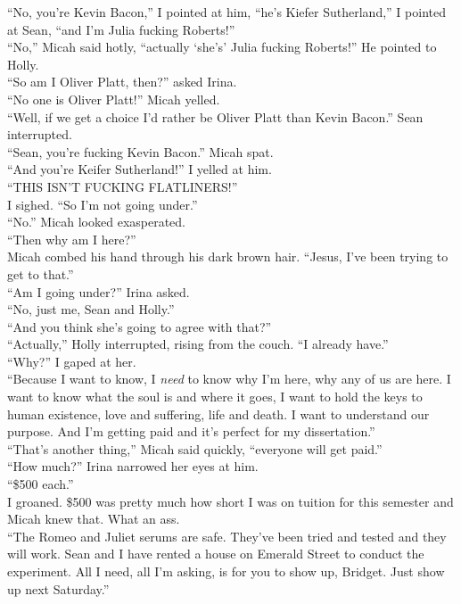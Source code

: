 \documentclass[a5paper]{scrartcl}
\begin{document}
\enquote{No, you're Kevin Bacon,” I pointed at him, “he's Kiefer Sutherland,} I pointed at Sean, \enquote{and I'm Julia fucking Roberts!}\\
\enquote{No,} Micah said hotly, \enquote{actually \enquote{she's} Julia fucking Roberts!} He pointed to Holly.\\
\enquote{So am I Oliver Platt, then?} asked Irina.\\
\enquote{No one is Oliver Platt!} Micah yelled.\\
\enquote{Well, if we get a choice I'd rather be Oliver Platt than Kevin Bacon.} Sean interrupted.\\
\enquote{Sean, you're fucking Kevin Bacon.} Micah spat.\\
\enquote{And you're Keifer Sutherland!} I yelled at him.\\
\enquote{THIS ISN'T FUCKING FLATLINERS!}\\
I sighed. \enquote{So I'm not going under.}\\
\enquote{No.} Micah looked exasperated.\\
\enquote{Then why am I here?}\\
Micah combed his hand through his dark brown hair. \enquote{Jesus, I've been trying to get to that.}\\
\enquote{Am I going under?} Irina asked.\\
\enquote{No, just me, Sean and Holly.}\\
\enquote{And you think she's going to agree with that?}\\
\enquote{Actually,} Holly interrupted, rising from the couch. \enquote{I already have.}\\
\enquote{Why?} I gaped at her.\\
\enquote{Because I want to know, I \textit{need} to know why I'm here, why any of us are here. I want to know what the soul is and where it goes, I want to hold the keys to human existence, love and suffering, life and death. I want to understand our purpose. And I'm getting paid and it's perfect for my dissertation.}\\
\enquote{That's another thing,} Micah said quickly, \enquote{everyone will get paid.}\\
\enquote{How much?} Irina narrowed her eyes at him.\\
\enquote{\$500 each.}\\
I groaned. \$500 was pretty much how short I was on tuition for this semester and Micah knew that. What an ass.\\
\enquote{The Romeo and Juliet serums are safe. They've been tried and tested and they will work. Sean and I have rented a house on Emerald Street to conduct the experiment. All I need, all I'm asking, is for you to show up, Bridget. Just show up next Saturday.}\\
\end{document}
